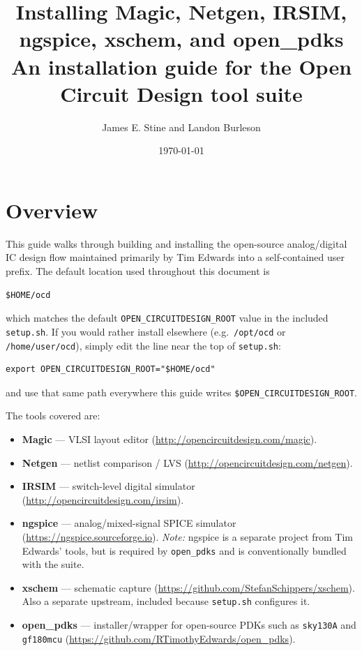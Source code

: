 \documentclass[11pt]{article}
\title{Installing Magic, Netgen, IRSIM, ngspice, xschem, and open\_pdks\\
       \large An installation guide for the Open Circuit Design tool suite}
\author{James E. Stine and Landon Burleson}
\date{\today}
\begin{document}
\maketitle

\section{Overview}

This guide walks through building and installing the open-source analog/digital
IC design flow maintained primarily by Tim Edwards into a self-contained user
prefix.  
The default location used throughout this document is
\begin{lstlisting}
$HOME/ocd
\end{lstlisting}

\noindent which matches the default \texttt{OPEN\_CIRCUITDESIGN\_ROOT} value
in the included \texttt{setup.sh}. If you would rather install elsewhere
(e.g.\ \texttt{/opt/ocd} or \texttt{/home/user/ocd}), simply
edit the line near the top of \texttt{setup.sh}:

\begin{lstlisting}
export OPEN_CIRCUITDESIGN_ROOT="$HOME/ocd"
\end{lstlisting}

\noindent and use that same path everywhere this guide writes
\texttt{\$OPEN\_CIRCUITDESIGN\_ROOT}.

The tools covered are:

\begin{itemize}[leftmargin=2em]
  \item \textbf{Magic} --- VLSI layout editor (\url{http://opencircuitdesign.com/magic}).
  \item \textbf{Netgen} --- netlist comparison / LVS
        (\url{http://opencircuitdesign.com/netgen}).
  \item \textbf{IRSIM} --- switch-level digital simulator
        (\url{http://opencircuitdesign.com/irsim}).
  \item \textbf{ngspice} --- analog/mixed-signal SPICE simulator
        (\url{https://ngspice.sourceforge.io}). \emph{Note:} ngspice is a
        separate project from Tim Edwards' tools, but is required by
        \texttt{open\_pdks} and is conventionally bundled with the suite.
  \item \textbf{xschem} --- schematic capture
        (\url{https://github.com/StefanSchippers/xschem}). Also a separate
        upstream, included because \texttt{setup.sh} configures it.
  \item \textbf{open\_pdks} --- installer/wrapper for open-source PDKs such
        as \texttt{sky130A} and \texttt{gf180mcu}
        (\url{https://github.com/RTimothyEdwards/open_pdks}).
\end{itemize}
\end{document}
